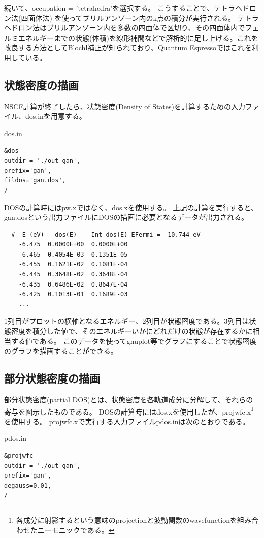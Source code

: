 続いて、occupation = 'tetrahedra'を選択する。
こうすることで、テトラヘドロン法(四面体法)
を使ってブリルアンゾーン内のk点の積分が実行される。
テトラヘドロン法はブリルアンゾーン内を多数の四面体で区切り、その四面体内でフェルミエネルギーまでの状態(体積)を線形補間などで解析的に足し上げる。これを改良する方法としてBlochl補正\cite{Blochl}が知られており、Quantum Espressoではこれを利用している。

\subsection{状態密度の描画}
NSCF計算が終了したら、状態密度(Density of States)を計算するための入力ファイル、dos.inを用意する。
\begin{example}{dos.in}
\begin{verbatim}
&dos
outdir = './out_gan',
prefix='gan',
fildos='gan.dos',
/
\end{verbatim}
\end{example}
DOSの計算時にはpw.xではなく、dos.xを使用する。
上記の計算を実行すると、gan.dosという出力ファイルにDOSの描画に必要となるデータが出力される。

\begin{code}
\begin{verbatim}
  #  E (eV)   dos(E)    Int dos(E) EFermi =  10.744 eV
    -6.475  0.0000E+00  0.0000E+00
    -6.465  0.4054E-03  0.1351E-05
    -6.455  0.1621E-02  0.1081E-04
    -6.445  0.3648E-02  0.3648E-04
    -6.435  0.6486E-02  0.8647E-04
    -6.425  0.1013E-01  0.1689E-03
    ...
\end{verbatim}
\end{code}
1列目がプロットの横軸となるエネルギー、2列目が状態密度である。3列目は状態密度を積分した値で、そのエネルギーいかにどれだけの状態が存在するかに相当する値である。
このデータを使ってgnuplot等でグラフにすることで状態密度のグラフを描画することができる。

\subsection{部分状態密度の描画}
部分状態密度(partial DOS)とは、状態密度を各軌道成分に分解して、それらの寄与を図示したものである。
DOSの計算時にはdos.xを使用したが、projwfc.x\footnote{各成分に射影するという意味のprojectionと波動関数のwavefunctionを組み合わせたニーモニックである。}を使用する。
projwfc.xで実行する入力ファイルpdos.inは次のとおりである。
\begin{example}{pdos.in}
\begin{verbatim}
&projwfc
outdir = './out_gan',
prefix='gan',
degauss=0.01,
/
\end{verbatim}
\end{example}

